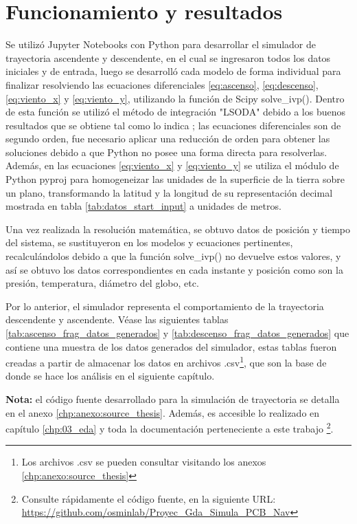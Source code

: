 \section{Funcionamiento y resultados}

Se utilizó Jupyter Notebooks con Python para desarrollar el simulador de trayectoria ascendente y descendente, en el cual se ingresaron todos los datos iniciales y de entrada, luego se desarrolló cada modelo de forma individual para finalizar resolviendo las ecuaciones diferenciales \ref{eq:ascenso}, \ref{eq:descenso}, \ref{eq:viento_x}  y \ref{eq:viento_y}, utilizando la función de Scipy  solve\_ivp(). Dentro de esta función se utilizó el método de integración  "LSODA"  debido a los buenos resultados que se obtiene tal como lo indica \cite{lsoda}; las ecuaciones diferenciales son de segundo orden, fue necesario aplicar una reducción de orden para obtener las soluciones debido a que Python no posee una forma directa para resolverlas.  Además,  en las ecuaciones \ref{eq:viento_x} y \ref{eq:viento_y} se utiliza el módulo de Python pyproj para homogeneizar las unidades  de la superficie de la tierra sobre un plano, transformando la latitud y la longitud de su representación decimal mostrada en tabla \ref{tab:datos_start_input} a unidades de metros.

Una vez realizada la resolución matemática, se obtuvo datos de posición y tiempo del sistema, se sustituyeron en los modelos y ecuaciones pertinentes, recalculándolos debido a que la función solve\_ivp() no devuelve estos valores, y así se obtuvo los datos correspondientes en cada instante y posición como son la presión, temperatura, diámetro del globo, etc.  

\newpage
Por lo anterior,  el simulador representa el comportamiento de la trayectoria descendente y ascendente. Véase las siguientes tablas \ref{tab:ascenso_frag_datos_generados} y \ref{tab:descenso_frag_datos_generados} que contiene una muestra de los datos generados del simulador, estas tablas fueron creadas a partir de almacenar los datos en archivos .csv\footnote{Los archivos .csv se pueden consultar visitando los anexos \ref{chp:anexo:source_thesis}}, que son la base de donde se hace los análisis en el siguiente capítulo.

\vspace{1 cm}

\textbf{Nota:} el código fuente desarrollado para la simulación de trayectoria  se detalla en el anexo \ref{chp:anexo:source_thesis}. Además, es accesible lo realizado en capítulo \ref{chp:03_eda} y toda la documentación perteneciente a este trabajo \footnote{Consulte rápidamente el código fuente, en la siguiente URL: \url{https://github.com/osminlab/Proyec_Gda_Simula_PCB_Nav}}.

